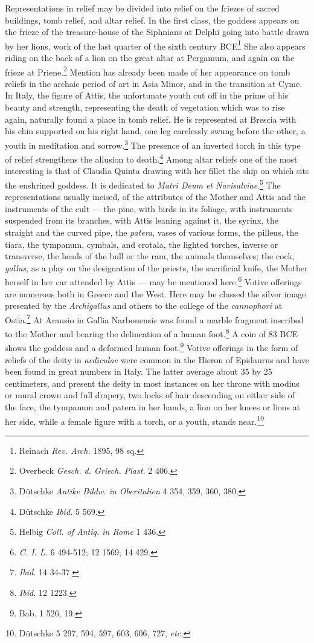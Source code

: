 \documentclass[a4paper, 11pt, oneside, polutonikogreek, english]{article}
\begin{document}
Representations in relief may be divided into relief on the friezes of sacred buildings, tomb relief, and altar relief. In the first class, the goddess appears on the frieze of the treasure-house of the Siphnians at Delphi going into battle drawn by her lions, work of the last quarter of the sixth century \textsc{BCE}\footnote{Reinach \emph{Rev. Arch.} 1895, 98 sq.} She also appears riding on the back of a lion on the great altar at Pergamum, and again on the frieze at Priene.\footnote{Overbeck \emph{Gesch. d. Griech. Plast.} 2 406.} Mention has already been made of her appearance on tomb reliefs in the archaic period of art in Asia Minor, and in the transition at Cyme. In Italy, the figure of Attis, the unfortunate youth cut off in the prime of his beauty and strength, representing the death of vegetation which was to rise again, naturally found a place in tomb relief. He is represented at Brescia with his chin supported on his right hand, one leg carelessly swung before the other, a youth in meditation and sorrow.\footnote{Dütschke \emph{Antike Bildw. in Oberitalien} 4 354, 359, 360, 380.} The presence of an inverted torch in this type of relief strengthens the allusion to death.\footnote{Dütschke \emph{Ibid.} 5 569.} Among altar reliefs one of the most interesting is that of Claudia Quinta drawing with her fillet the ship on which sits the enshrined goddess. It is dedicated to \emph{Matri Deum et Navisalviae}.\footnote{Helbig \emph{Coll. of Antiq. in Rome} 1 436.} The representations usually incised, of the attributes of the Mother and Attis and the instruments of the cult --- the pine, with birds in its foliage, with instruments suspended from its branches, with Attis leaning against it, the syrinx, the straight and the curved pipe, the \emph{patera}, vases of various forms, the pilleus, the tiara, the tympanum, cymbals, and crotala, the lighted torches, inverse or transverse, the heads of the bull or the ram, the animals themselves; the cock, \emph{gallus}, as a play on the designation of the priests, the sacrificial knife, the Mother herself in her car attended by Attis --- may be mentioned here.\footnote{\emph{C. I. L.} 6 494-512; 12 1569; 14 429.} Votive offerings are numerous both in Greece and the West. Here may be classed the silver image presented by the \emph{Archigallus} and others to the college of the \emph{cannophori} at Ostia.\footnote{\emph{Ibid.} 14 34-37.} At Arausio in Gallia Narbonensis was found a marble fragment inscribed to the Mother and bearing the delineation of a human foot.\footnote{\emph{Ibid.} 12 1223.} A coin of 83 \textsc{BCE} shows the goddess and a deformed human foot.\footnote{Bab. 1 526, 19.} Votive offerings in the form of reliefs of the deity in \emph{aediculae} were common in the Hieron of Epidaurus and have been found in great numbers in Italy. The latter average about 35 by 25 centimeters, and present the deity in most instances on her throne with modius or mural crown and full drapery, two locks of hair descending on either side of the face, the tympanum and patera in her hands, a lion on her knees or lions at her side, while a female figure with a torch, or a youth, stands near.\footnote{Dütschke 5 297, 594, 597, 603, 606, 727, \emph{etc.}}
\end{document}
